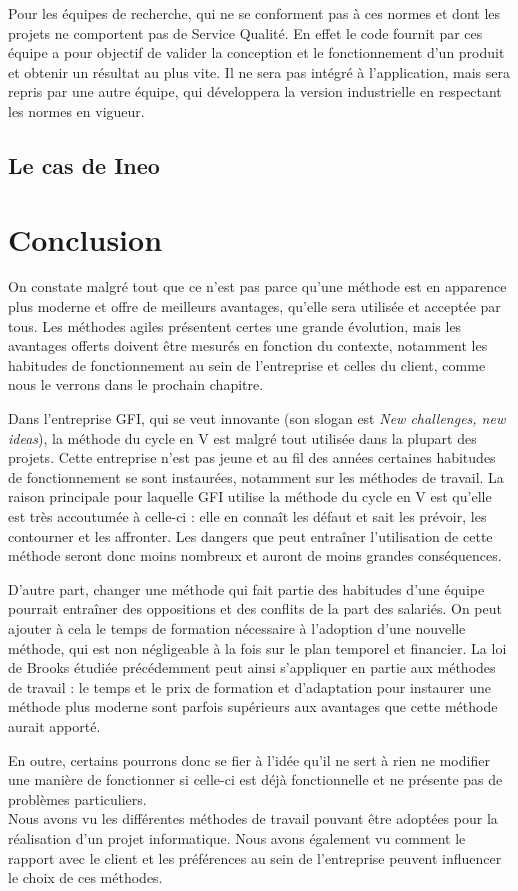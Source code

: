 Pour les équipes de recherche, qui ne se conforment pas à ces normes et dont les projets ne comportent pas de Service Qualité. En effet le code fournit par ces équipe a pour objectif de valider la conception et le fonctionnement d'un produit et obtenir un résultat au plus vite. Il ne sera pas intégré à l'application, mais sera repris par une autre équipe, qui développera la version industrielle en respectant les normes en vigueur.

\subsection{Le cas de Ineo}

\section{Conclusion}

On constate malgré tout que ce n'est pas parce qu'une méthode est en apparence plus moderne et offre de meilleurs avantages, qu'elle sera utilisée et acceptée par tous. Les méthodes agiles présentent certes une grande évolution, mais les avantages offerts doivent être mesurés en fonction du contexte, notamment les habitudes de fonctionnement au sein de l'entreprise et celles du client, comme nous le verrons dans le prochain chapitre.

\begin{app}
Dans l'entreprise GFI, qui se veut innovante (son slogan est \textit{New challenges, new ideas}), la méthode du cycle en V est malgré tout utilisée dans la plupart des projets. Cette entreprise n'est pas jeune et au fil des années certaines habitudes de fonctionnement se sont instaurées, notamment sur les méthodes de travail. La raison principale pour laquelle GFI utilise la méthode du cycle en V est qu'elle est très accoutumée à celle-ci : elle en connaît les défaut et sait les prévoir, les contourner et les affronter. Les dangers que peut entraîner l'utilisation de cette méthode seront donc moins nombreux et auront de moins grandes conséquences.
\end{app}

D'autre part, changer une méthode qui fait partie des habitudes d'une équipe pourrait entraîner des oppositions et des conflits de la part des salariés. On peut ajouter à cela le temps de formation nécessaire à l'adoption d'une nouvelle méthode, qui est non négligeable à la fois sur le plan temporel et financier. La loi de Brooks étudiée précédemment peut ainsi s'appliquer en partie aux méthodes de travail : le temps et le prix de formation et d'adaptation pour instaurer une méthode plus moderne sont parfois supérieurs aux avantages que cette méthode aurait apporté.

En outre, certains pourrons donc se fier à l'idée qu'il ne sert à rien ne modifier une manière de fonctionner si celle-ci est déjà fonctionnelle et ne présente pas de problèmes particuliers.\\

Nous avons vu les différentes méthodes de travail pouvant être adoptées pour la réalisation d'un projet informatique. Nous avons également vu comment le rapport avec le client et les préférences au sein de l'entreprise peuvent influencer le choix de ces méthodes.
